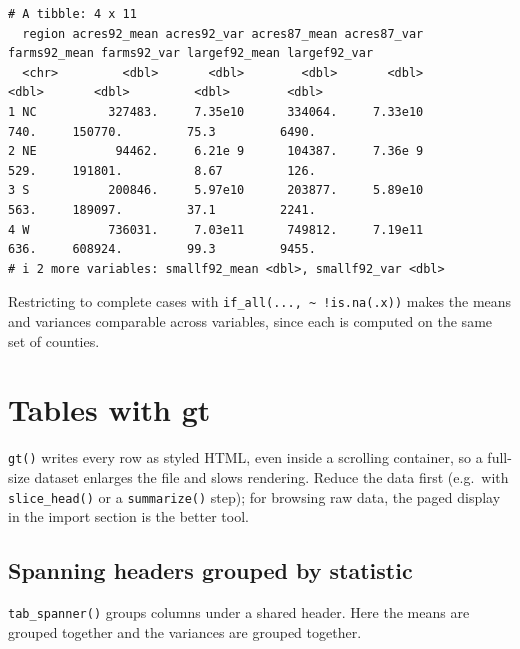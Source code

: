 \documentclass[
  letterpaper,
  DIV=11,
  numbers=noendperiod]{scrreprt}
\renewcommand{\[}{\begin{equation}}
\renewcommand{\]}{\end{equation}}
\begin{document}
\begin{verbatim}
# A tibble: 4 x 11
  region acres92_mean acres92_var acres87_mean acres87_var farms92_mean farms92_var largef92_mean largef92_var
  <chr>         <dbl>       <dbl>        <dbl>       <dbl>        <dbl>       <dbl>         <dbl>        <dbl>
1 NC          327483.     7.35e10      334064.     7.33e10         740.     150770.         75.3         6490.
2 NE           94462.     6.21e 9      104387.     7.36e 9         529.     191801.          8.67         126.
3 S           200846.     5.97e10      203877.     5.89e10         563.     189097.         37.1         2241.
4 W           736031.     7.03e11      749812.     7.19e11         636.     608924.         99.3         9455.
# i 2 more variables: smallf92_mean <dbl>, smallf92_var <dbl>
\end{verbatim}

Restricting to complete cases with
\texttt{if\_all(...,\ \textasciitilde{}\ !is.na(.x))} makes the means
and variances comparable across variables, since each is computed on the
same set of counties.

\section{Tables with gt}\label{tables-with-gt}

\texttt{gt()} writes every row as styled HTML, even inside a scrolling
container, so a full-size dataset enlarges the file and slows rendering.
Reduce the data first (e.g.~with \texttt{slice\_head()} or a
\texttt{summarize()} step); for browsing raw data, the paged display in
the import section is the better tool.

\subsection{Spanning headers grouped by
statistic}\label{spanning-headers-grouped-by-statistic}

\texttt{tab\_spanner()} groups columns under a shared header. Here the
means are grouped together and the variances are grouped together.
\end{document}
